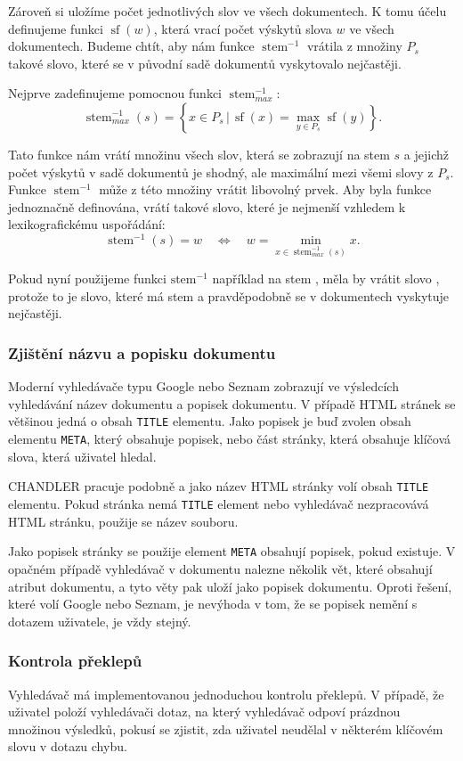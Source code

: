 \documentclass[12pt]{article}
\newcommand{\name}{CHANDLER}
\newcommand{\code}[1]{\texttt{#1}}
\newcommand{\sep}{\,|\,}
\newcommand{\sssection}[1]{\subsubsection{#1}}
\newcommand{\adds}[1]{\left\{#1\right\}}
\newcommand{\eq}{\Leftrightarrow}
\DeclareMathOperator{\stem}{stem}
\DeclareMathOperator{\wcount}{sf}
\newcommand{\invstem}{\stem^{-1}}
\begin{document}
Zároveň si uložíme počet jednotlivých slov ve všech dokumentech. K tomu účelu definujeme funkci $\wcount(w)$, která vrací počet výskytů slova $w$ ve všech dokumentech. Budeme chtít, aby nám funkce $\invstem$ vrátila z množiny $P_s$ takové slovo, které se v původní sadě dokumentů vyskytovalo nejčastěji. 

Nejprve zadefinujeme pomocnou funkci $\invstem_{max}$:
$$\invstem_{max}(s)=\adds{x\in P_s \sep \wcount(x) = \max_{y\in P_s}\wcount(y)}.$$

Tato funkce nám vrátí množinu všech slov, která se zobrazují na stem $s$ a jejichž počet výskytů v sadě dokumentů je shodný, ale maximální mezi všemi slovy z $P_s$. Funkce $\invstem$ může z této množiny vrátit libovolný prvek. Aby byla funkce jednoznačně definována, vrátí takové slovo, které je nejmenší vzhledem k lexikografickému uspořádání:
$$\invstem(s)=w\quad\eq\quad w=\min_{x\in \invstem_{max}(s)}x.$$

Pokud nyní použijeme funkci $\mbox{stem}^{-1}$ například na stem , měla by vrátit slovo , protože to je slovo, které má stem  a pravděpodobně se v dokumentech vyskytuje nejčastěji. 

\sssection{Zjištění názvu a popisku dokumentu}
Moderní vyhledávače typu Google nebo Seznam zobrazují ve výsledcích vyhledávání název dokumentu a popisek dokumentu. V případě HTML stránek se většinou jedná o obsah \code{TITLE} elementu. Jako popisek je buď zvolen obsah elementu \code{META}, který obsahuje popisek, nebo část stránky, která obsahuje klíčová slova, která uživatel hledal. 

\name{} pracuje podobně a jako název HTML stránky volí obsah \code{TITLE} elementu. Pokud stránka nemá \code{TITLE} element nebo vyhledávač nezpracovává HTML stránku, použije se název souboru. 

Jako popisek stránky se použije element \code{META} obsahují popisek, pokud existuje. V opačném případě vyhledávač v dokumentu nalezne několik vět, které obsahují atribut dokumentu, a tyto věty pak uloží jako popisek dokumentu. Oproti řešení, které volí Google nebo Seznam, je nevýhoda v tom, že se popisek nemění s dotazem uživatele, je vždy stejný. 

\sssection{Kontrola překlepů}
Vyhledávač má implementovanou jednoduchou kontrolu překlepů. V případě, že uživatel položí vyhledávači dotaz, na který vyhledávač odpoví prázdnou množinou výsledků, pokusí se zjistit, zda uživatel neudělal v některém klíčovém slovu v dotazu chybu. 
\end{document}
